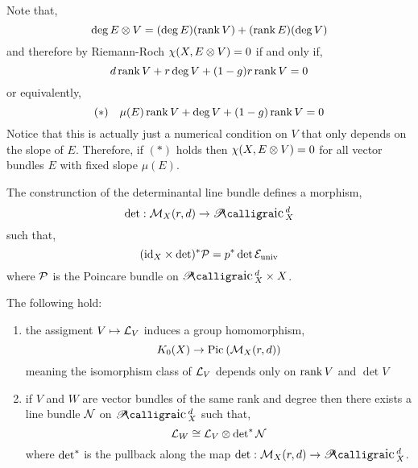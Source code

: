 \documentclass[12pt]{article}
\begin{document}
\begin{rmk}
Note that,
\[ \deg{E \otimes V} = (\deg{E}) (\operatorname{\mathrm{rank}}{V}) + (\operatorname{\mathrm{rank}}{E}) (\deg{V}) \]
and therefore by Riemann-Roch $\chi(X, E \otimes V) = 0$ if and only if,
\[ d \operatorname{\mathrm{rank}}{V} + r \deg{V} + (1-g) r \operatorname{\mathrm{rank}}{V} = 0 \]
or equivalently,
\[ (\ast) \quad \mu(E) \operatorname{\mathrm{rank}}{V} + \deg{V} + (1-g) \operatorname{\mathrm{rank}}{V} = 0 \]
Notice that this is actually just a numerical condition on $V$ that only depends on the slope of $E$. Therefore, if $(\ast)$ holds then $\chi(X, E \otimes V) = 0$ for all vector bundles $E$ with fixed slope $\mu(E)$.
\end{rmk}

The construnction of the determinantal line bundle defines a morphism,
\[ \det : \M_X(r, d) \to \cPic^d_X \]
such that,
\[ (\mathrm{id}_X \times \det)^* \mathcal{P} = p^* \det{\mathcal{E}_{\mathrm{univ}}} \]
where $\mathcal{P}$ is the Poincare bundle on $\cPic^d_X \times X$. 

\begin{prop}
The following hold:
\begin{enumerate}
\item the assigment $V \mapsto \mathcal{L}_V$ induces a group homomorphism,
\[ K_0(X) \to \mathrm{Pic}^{} \left( \mathcal{M}_X(r,d) \right) \]
meaning the isomorphism class of $\mathcal{L}_V$ depends only on $\operatorname{\mathrm{rank}}{V}$ and $\det{V}$
\item if $V$ and $W$ are vector bundles of the same rank and degree then there exists a line bundle $\mathcal{N}$ on $\cPic_X^d$ such that,
\[ \mathcal{L}_W \cong \mathcal{L}_V \otimes \det\nolimits^{*} \mathcal{N} \]
where $\det\nolimits^{*}$ is the pullback along the map $\det : \M_X(r,d) \to \cPic^d_X$.
\end{enumerate}
\end{prop}
\end{document}
